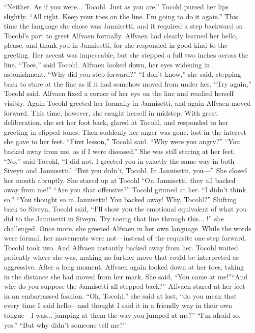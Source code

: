 \documentclass[9pt]{article}
\begin{document}
“Neither. As if you were... Tocohl. Just as you are.”
Tocohl pursed her lips slightly. “All right. Keep your toes on the line. I’m going to do it again.” This
time the language she chose was Jannisetti, and it required a step backward on Tocohl’s part to greet
Alfvaen formally.
Alfvaen had clearly learned her hello, please, and thank you in Jannisetti, for she responded in good
kind to the greeting. Her accent was impeccable, but she stepped a full two inches across the line.
“Toes,” said Tocohl. Alfvaen looked down, her eyes widening in astonishment.
“Why did you step forward?”
“I don’t know,” she said, stepping back to stare at the line as if it had somehow moved from under
her.
“Try again,” Tocohl said. Alfvaen fixed a corner of her eye on the line and readied herself visibly.
Again Tocohl greeted her formally in Jannisetti, and again Alfvaen moved forward. This time, however,
she caught herself in midstep.
With great deliberation, she set her foot back, glared at Tocohl, and responded to her greeting in
clipped tones. Then suddenly her anger was gone, lost in the interest she gave to her feet.
“First lesson,” Tocohl said. “Why were you angry?”
“You backed away from me, as if I were diseased.” She was still staring at her feet.
“No,” said Tocohl, “I did not. I greeted you in exactly the same way in both Siveyn and Jannisetti.’
“But you didn’t, Tocohl. In Jannisetti, you—” She closed her mouth abruptly. She stared up at
Tocohl “On Jannisetti, they all backed away from me!”
“Are you that offensive?” Tocohl grinned at her. “I didn’t think so.”
“You thought so in Jannisetti! You backed away! Why, Tocohl?”
Shifting back to Siveyn, Tocohl said, “I’ll show you the emotional equivalent of what you did to the
Jannisetti in Siveyn. Try toeing that line through this... !” she challenged. Once more, she greeted Alfvaen
in her own language. While the words were formal, her movements were not—instead of the requisite
one step forward, Tocohl took two.
And Alfvaen instantly backed away from her.
Tocohl waited patiently where she was, making no further move that could be interpreted as
aggressive.
After a long moment, Alfvaen again looked down at her toes, taking in the distance she had moved
from her mark. She said, “You came at me!”“And why do you suppose the Jannisetti all stepped back?”
Alfvaen stared at her feet in an embarrassed fashion. “Oh, Tocohl,” she said at last, “do you mean
that every time I said hello—and thought I said it in a friendly way in their own tongue—I was... jumping
at them the way you jumped at me?”
“I’m afraid so, yes.”
“But why didn’t someone tell me?”
\end{document}
